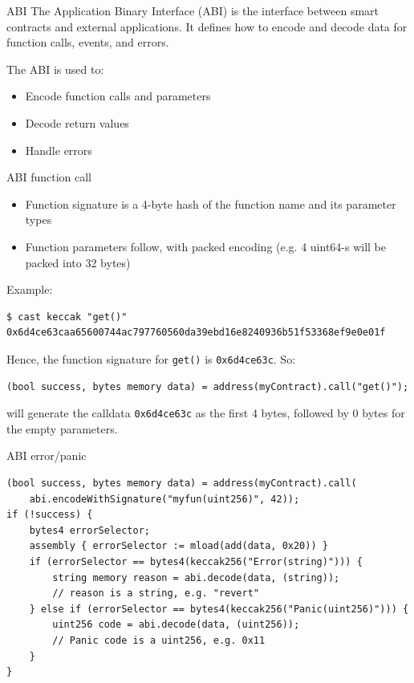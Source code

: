 \documentclass[aspectratio=169]{beamer}
\begin{document}
\begin{frame}{ABI}
The Application Binary Interface (ABI) is the interface between smart contracts
and external applications. It defines how to encode and decode data for
function calls, events, and errors.
\bigskip

The ABI is used to:
\begin{itemize}
    \item Encode function calls and parameters
    \item Decode return values
    \item Handle errors
\end{itemize}
\end{frame}

\begin{frame}[fragile=singleslide]{ABI function call}
\begin{itemize}
    \item Function signature is a 4-byte hash of the function name and its parameter types
    \item Function parameters follow, with packed encoding (e.g. 4 uint64-s will be packed into 32 bytes)
\end{itemize}
\bigskip

Example:
\begin{Verbatim}[frame=single, framerule=0.2mm, framesep=2mm,fontsize=\small]
$ cast keccak "get()"
0x6d4ce63caa65600744ac797760560da39ebd16e8240936b51f53368ef9e0e01f
\end{Verbatim}
Hence, the function signature for \texttt{get()} is \texttt{0x6d4ce63c}. So:

\begin{Verbatim}[frame=single, framerule=0.2mm, framesep=2mm,fontsize=\small]
(bool success, bytes memory data) = address(myContract).call("get()");
\end{Verbatim}

will generate the calldata \texttt{0x6d4ce63c} as the first 4 bytes, followed by 0 bytes for the empty parameters.
\end{frame}

\begin{frame}[fragile=singleslide]{ABI error/panic}
\begin{Verbatim}[frame=single, framerule=0.2mm, framesep=2mm,fontsize=\small]
(bool success, bytes memory data) = address(myContract).call(
    abi.encodeWithSignature("myfun(uint256)", 42));
if (!success) {
    bytes4 errorSelector;
    assembly { errorSelector := mload(add(data, 0x20)) }
    if (errorSelector == bytes4(keccak256("Error(string)"))) {
        string memory reason = abi.decode(data, (string));
        // reason is a string, e.g. "revert"
    } else if (errorSelector == bytes4(keccak256("Panic(uint256)"))) {
        uint256 code = abi.decode(data, (uint256));
        // Panic code is a uint256, e.g. 0x11
    }
}
\end{Verbatim}
\end{frame}
\end{document}
